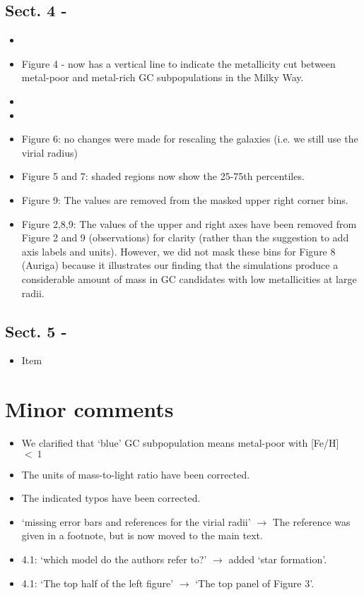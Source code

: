 \documentclass{article}
\begin{document}
\subsection*{Sect. 4 -}
\begin{itemize}
\item
\item Figure 4 - now has a vertical line to indicate the metallicity cut 
between metal-poor and metal-rich GC subpopulations in the Milky Way.
\item
\item
\item Figure 6: no changes were made for rescaling the galaxies (i.e. we still
use the virial radius)
\item Figure 5 and 7: shaded regions now show the 25-75th percentiles.
\item Figure 9: The values are removed from the masked upper right corner bins.
\item Figure 2,8,9: The values of the upper and right axes have been removed from
Figure 2 and 9 (observations) for clarity (rather than the suggestion to add 
axis labels and units). However, we did not mask these bins for Figure 8 (Auriga)
because it illustrates our finding that the simulations produce a considerable
amount of mass in GC candidates with low metallicities at large radii.
\end{itemize}

\subsection*{Sect. 5 -}
\begin{itemize}
\item Item
\end{itemize}



\section*{Minor comments}
\begin{itemize}
\item We clarified that `blue' GC subpopulation means metal-poor with [Fe/H]~$<~1$
\item The units of mass-to-light ratio have been corrected.
\item The indicated typos have been corrected.
\item `missing error bars and references for the virial radii' $\rightarrow$
    The reference was given in a footnote, but is now moved to the main text.
\item 4.1: `which model do the authors refer to?' $\rightarrow$ 
    added `star formation'.
\item 4.1: `The top half of the left figure' $\rightarrow$ 
    `The top panel of Figure 3'.
\end{itemize}
\end{document}

